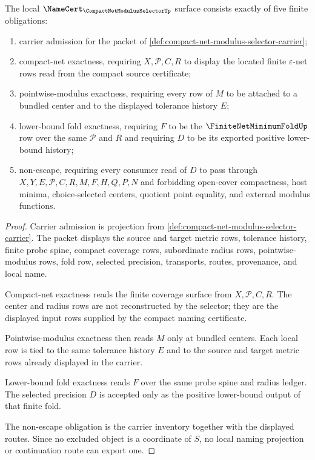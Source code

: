 \begin{theorem}
\label{thm:compact-net-modulus-selector-namecert-obligations}
The local $\NameCert_{\CompactNetModulusSelectorUp}$ surface consists exactly of five finite obligations:
\begin{enumerate}
\item carrier admission for the packet of \autoref{def:compact-net-modulus-selector-carrier};
\item compact-net exactness, requiring $X,\mathcal{P},C,R$ to display the located finite $\varepsilon$-net rows read from the compact source certificate;
\item pointwise-modulus exactness, requiring every row of $M$ to be attached to a bundled center and to the displayed tolerance history $E$;
\item lower-bound fold exactness, requiring $F$ to be the $\FiniteNetMinimumFoldUp$ row over the same $\mathcal{P}$ and $R$ and requiring $D$ to be its exported positive lower-bound history;
\item non-escape, requiring every consumer read of $D$ to pass through $X,Y,E,\mathcal{P},C,R,M,F,H,Q,P,N$ and forbidding open-cover compactness, host minima, choice-selected centers, quotient point equality, and external modulus functions.
\end{enumerate}
\end{theorem}

\begin{proof}
Carrier admission is projection from \autoref{def:compact-net-modulus-selector-carrier}. The packet displays the source and target metric rows, tolerance history, finite probe spine, compact coverage rows, subordinate radius rows, pointwise-modulus rows, fold row, selected precision, transports, routes, provenance, and local name.

Compact-net exactness reads the finite coverage surface from $X,\mathcal{P},C,R$. The center and radius rows are not reconstructed by the selector; they are the displayed input rows supplied by the compact naming certificate.

Pointwise-modulus exactness then reads $M$ only at bundled centers. Each local row is tied to the same tolerance history $E$ and to the source and target metric rows already displayed in the carrier.

Lower-bound fold exactness reads $F$ over the same probe spine and radius ledger. The selected precision $D$ is accepted only as the positive lower-bound output of that finite fold.

The non-escape obligation is the carrier inventory together with the displayed routes. Since no excluded object is a coordinate of $S$, no local naming projection or continuation route can export one.
\end{proof}

